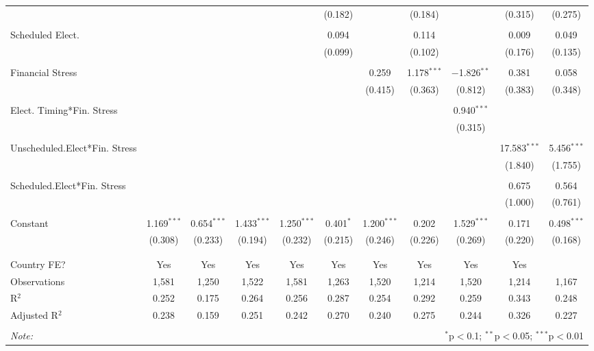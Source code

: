 \begin{table}[!htbp]
\begin{tabular}{@{\extracolsep{5pt}}lcccccccccc}
  &  &  &  &  & (0.182) &  & (0.184) &  & (0.315) & (0.275) \\ 
  & & & & & & & & & & \\ 
 Scheduled Elect. &  &  &  &  & 0.094 &  & 0.114 &  & 0.009 & 0.049 \\ 
  &  &  &  &  & (0.099) &  & (0.102) &  & (0.176) & (0.135) \\ 
  & & & & & & & & & & \\ 
 Financial Stress &  &  &  &  &  & 0.259 & 1.178$^{***}$ & $-$1.826$^{**}$ & 0.381 & 0.058 \\ 
  &  &  &  &  &  & (0.415) & (0.363) & (0.812) & (0.383) & (0.348) \\ 
  & & & & & & & & & & \\ 
 Elect. Timing*Fin. Stress &  &  &  &  &  &  &  & 0.940$^{***}$ &  &  \\ 
  &  &  &  &  &  &  &  & (0.315) &  &  \\ 
  & & & & & & & & & & \\ 
 Unscheduled.Elect*Fin. Stress &  &  &  &  &  &  &  &  & 17.583$^{***}$ & 5.456$^{***}$ \\ 
  &  &  &  &  &  &  &  &  & (1.840) & (1.755) \\ 
  & & & & & & & & & & \\ 
 Scheduled.Elect*Fin. Stress &  &  &  &  &  &  &  &  & 0.675 & 0.564 \\ 
  &  &  &  &  &  &  &  &  & (1.000) & (0.761) \\ 
  & & & & & & & & & & \\ 
 Constant & 1.169$^{***}$ & 0.654$^{***}$ & 1.433$^{***}$ & 1.250$^{***}$ & 0.401$^{*}$ & 1.200$^{***}$ & 0.202 & 1.529$^{***}$ & 0.171 & 0.498$^{***}$ \\ 
  & (0.308) & (0.233) & (0.194) & (0.232) & (0.215) & (0.246) & (0.226) & (0.269) & (0.220) & (0.168) \\ 
  & & & & & & & & & & \\ 
\hline \\[-1.8ex] 
Country FE? & Yes & Yes & Yes & Yes & Yes & Yes & Yes & Yes & Yes &  \\ 
Observations & 1,581 & 1,250 & 1,522 & 1,581 & 1,263 & 1,520 & 1,214 & 1,520 & 1,214 & 1,167 \\ 
R$^{2}$ & 0.252 & 0.175 & 0.264 & 0.256 & 0.287 & 0.254 & 0.292 & 0.259 & 0.343 & 0.248 \\ 
Adjusted R$^{2}$ & 0.238 & 0.159 & 0.251 & 0.242 & 0.270 & 0.240 & 0.275 & 0.244 & 0.326 & 0.227 \\ 
\hline 
\hline \\[-1.8ex] 
\textit{Note:}  & \multicolumn{10}{r}{$^{*}$p$<$0.1; $^{**}$p$<$0.05; $^{***}$p$<$0.01} \\ 
\end{tabular} 
\end{table} 

